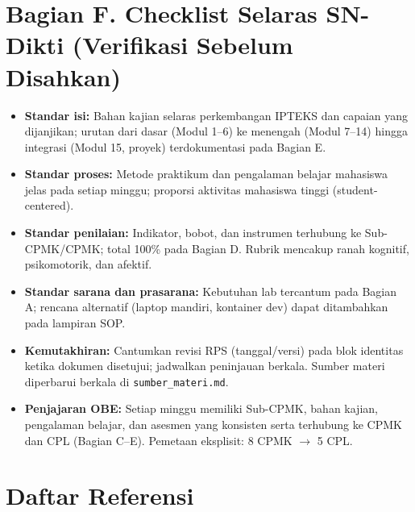\documentclass[12pt,a4paper]{article}
\begin{document}
\vspace{0.75cm}

\section*{Bagian F. Checklist Selaras SN-Dikti (Verifikasi Sebelum Disahkan)}

\begin{itemize}[leftmargin=*]
  \item \textbf{Standar isi:} Bahan kajian selaras perkembangan IPTEKS dan capaian yang dijanjikan; urutan dari dasar (Modul 1--6) ke menengah (Modul 7--14) hingga integrasi (Modul 15, proyek) terdokumentasi pada Bagian E.
  \item \textbf{Standar proses:} Metode praktikum dan pengalaman belajar mahasiswa jelas pada setiap minggu; proporsi aktivitas mahasiswa tinggi (student-centered).
  \item \textbf{Standar penilaian:} Indikator, bobot, dan instrumen terhubung ke Sub-CPMK/CPMK; total 100\% pada Bagian D. Rubrik mencakup ranah kognitif, psikomotorik, dan afektif.
  \item \textbf{Standar sarana dan prasarana:} Kebutuhan lab tercantum pada Bagian A; rencana alternatif (laptop mandiri, kontainer dev) dapat ditambahkan pada lampiran SOP.
  \item \textbf{Kemutakhiran:} Cantumkan revisi RPS (tanggal/versi) pada blok identitas ketika dokumen disetujui; jadwalkan peninjauan berkala. Sumber materi diperbarui berkala di \texttt{sumber\_materi.md}.
  \item \textbf{Penjajaran OBE:} Setiap minggu memiliki Sub-CPMK, bahan kajian, pengalaman belajar, dan asesmen yang konsisten serta terhubung ke CPMK dan CPL (Bagian C--E). Pemetaan eksplisit: 8 CPMK $\rightarrow$ 5 CPL.
\end{itemize}

\vspace{1cm}

\section*{Daftar Referensi}
\end{document}
